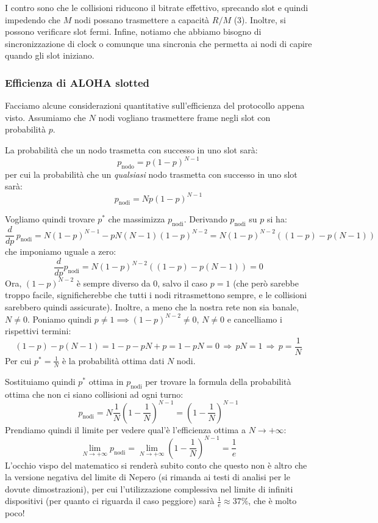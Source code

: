 \documentclass[a4paper,11pt]{article}
\begin{document}
I contro sono che le collisioni riducono il bitrate effettivo, sprecando slot e quindi impedendo che $M$ nodi possano trasmettere a capacità $R/M$ (3). Inoltre, si possono verificare slot fermi. Infine, notiamo che abbiamo bisogno di sincronizzazione di clock o comunque una sincronia che permetta ai nodi di capire quando gli slot iniziano.

\subsubsection{Efficienza di ALOHA slotted}
Facciamo alcune considerazioni quantitative sull'efficienza del protocollo appena visto.
Assumiamo che $N$ nodi vogliano trasmettere frame negli slot con probabilità $p$.

La probabilità che un nodo trasmetta con successo in uno slot sarà:
$$
p_\text{nodo} = p(1 - p)^{N - 1}
$$
per cui la probabilità che un \textit{qualsiasi} nodo trasmetta con successo in uno slot sarà:
$$
p_{\text{nodi}} = N p(1 - p)^{N - 1}
$$

Vogliamo quindi trovare $p^*$ che massimizza $p_\text{nodi}$.
Derivando $p_\text{nodi}$ su $p$ si ha:
$$
\frac{d}{dp} \, p_\text{nodi} = N(1 - p)^{N - 1} - p N (N - 1) (1 - p)^{N - 2}
= N (1 - p)^{N - 2} \left( (1 - p) - p(N - 1) \right)
$$
che imponiamo uguale a zero:
$$
\frac{d}{dp} p_\text{nodi} = N (1 - p)^{N - 2} \left( (1 - p) - p(N - 1) \right) = 0
$$
Ora, $(1 - p)^{N - 2}$ è sempre diverso da 0, salvo il caso $p = 1$ (che però sarebbe troppo facile, significherebbe che tutti i nodi ritrasmettono sempre, e le collisioni sarebbero quindi assicurate).
Inoltre, a meno che la nostra rete non sia banale, $N \neq 0$.
Poniamo quindi $p \neq 1 \implies (1 - p)^{N - 2} \neq 0$, $N \neq 0$ e cancelliamo i rispettivi termini:
$$
(1 - p) - p(N - 1) = 1 - p - pN + p = 1 - pN = 0 \, \Rightarrow \, pN = 1 \, \Rightarrow \, p = \frac{1}{N} 
$$
Per cui $p^* = \frac{1}{N}$ è la probabilità ottima dati $N$ nodi.

Sostituiamo quindi $p^*$ ottima in $p_\text{nodi}$ per trovare la formula della probabilità ottima che non ci siano collisioni ad ogni turno:
$$
p_\text{nodi} = N \frac{1}{N} \left( 1 - \frac{1}{N} \right)^{N - 1} = \left( 1 - \frac{1}{N} \right)^{N - 1}
$$
Prendiamo quindi il limite per vedere qual'è l'efficienza ottima a $N \rightarrow +\infty$:
$$
\lim_{N \rightarrow + \infty} p_{\text{nodi}} = \lim_{N \rightarrow + \infty} \left( 1 - \frac{1}{N} \right)^{N - 1} = \frac{1}{e}
$$
L'occhio vispo del matematico si renderà subito conto che questo non è altro che la versione negativa del limite di Nepero (si rimanda ai testi di analisi per le dovute dimostrazioni), per cui l'utilizzazione complessiva nel limite di infiniti dispositivi (per quanto ci riguarda il caso peggiore) sarà $\frac{1}{e} \approx 37\%$, che è molto poco!
\end{document}

